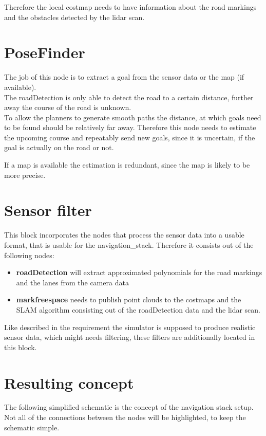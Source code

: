 Therefore the local costmap needs to have information about the road markings and the obstacles detected by the lidar scan.

\section{PoseFinder}
The job of this node is to extract a goal from the sensor data or the map (if available).\\

The roadDetection is only able to detect the road to a certain distance, further away the course of the road is unknown.\\
To allow the planners to generate smooth paths the distance, at which goals need to be found should be relatively far away. Therefore this node needs to estimate the upcoming course and repeatably send new goals, since it is uncertain, if the goal is actually on the road or not.

If a map is available the estimation is redundant, since the map is likely to be more precise.
\section{Sensor filter}

This block incorporates the nodes that process the sensor data into a usable format, that is usable for the navigation\_stack. 
Therefore it consists out of the following nodes:

\begin{itemize}
	\item \textbf{roadDetection} will extract approximated polynomials for the road markings and the lanes from the camera data
	\item \textbf{markfreespace} needs to publish point clouds to the costmaps and the SLAM algorithm consisting out of the roadDetection data and the lidar scan.
\end{itemize}

Like described in the requirement the simulator is supposed to produce realistic sensor data, which might needs filtering, these filters are additionally located in this block.

\section{Resulting concept}
The following simplified schematic is the concept of the navigation stack setup. Not all of the connections between the nodes will be highlighted, to keep the schematic simple.\\

